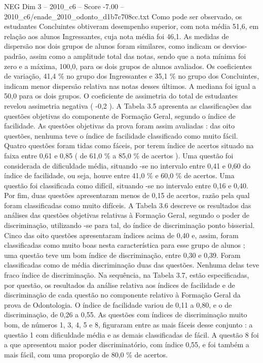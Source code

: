 \begin{textsample}{NEG Dim 3 – 2010\_c6 – Score -7.00 – 2010\_c6/enade\_2010\_odonto\_d1b7c708cc.txt}
Como pode ser observado, os estudantes Concluintes obtiveram desempenho superior, com nota média 51,6, em relação aos alunos Ingressantes, cuja nota média foi 46,1.
As medidas de dispersão nos dois grupos de alunos foram similares, como indicam os desvios-padrão, assim como a amplitude total das notas, sendo que a nota mínima foi zero e a máxima, 100,0, para os dois grupos de alunos avaliados.
Os coeficientes de variação, 41,4 \% no grupo dos Ingressantes e 35,1 \% no grupo dos Concluintes, indicam menor dispersão relativa nas notas desses últimos.
A mediana foi igual a 50,0 para os dois grupos.
O coeficiente de assimetria do total de estudantes revelou assimetria negativa ( -0,2 ).
A Tabela 3.5 apresenta as classificações das questões objetivas do componente de Formação Geral, segundo o índice de facilidade.
As questões objetivas da prova foram assim avaliadas : das oito questões, nenhuma teve o índice de facilidade classificado como muito fácil.
Quatro questões foram tidas como fáceis, por terem índice de acertos situado na faixa entre 0,61 e 0,85 ( de 61,0 \% a 85,0 \% de acertos ).
Uma questão foi considerada de dificuldade média, situando -se no intervalo entre 0,41 e 0,60 do índice de facilidade, ou seja, houve entre 41,0 \% e 60,0 \% de acertos.
Uma questão foi classificada como difícil, situando -se no intervalo entre 0,16 e 0,40.
Por fim, duas questões apresentaram menos de 0,15 de acertos, razão pela qual foram classificadas como muito difíceis.
A Tabela 3.6 descreve os resultados das análises das questões objetivas relativas à Formação Geral, segundo o poder de discriminação, utilizando -se para tal, do índice de discriminação ponto bisserial.
Cinco das oito questões apresentaram índices acima de 0,40 e, assim, foram classificadas como muito boas nesta característica para esse grupo de alunos ; uma questão teve um bom índice de discriminação, entre 0,30 e 0,39.
Foram classificadas como de média discriminação duas das questões.
Nenhuma delas teve fraco índice de discriminação.
Na sequência, na Tabela 3.7, estão especificadas, por questão, os resultados da análise relativa aos índices de facilidade e de discriminação de cada questão no componente relativo à Formação Geral da prova de Odontologia.
O índice de facilidade variou de 0,11 a 0,80, e o de discriminação, de 0,26 a 0,55.
As questões com índices de discriminação muito bom, de números 1, 3, 4, 5 e 8, figuraram entre as mais fáceis desse conjunto : a questão 1 com dificuldade média e as demais classificadas de fácil.
A questão 8 foi a que apresentou maior poder discriminatório, com índice 0,55, e foi também a mais fácil, com uma proporção de 80,0 \% de acertos.

\end{textsample}
